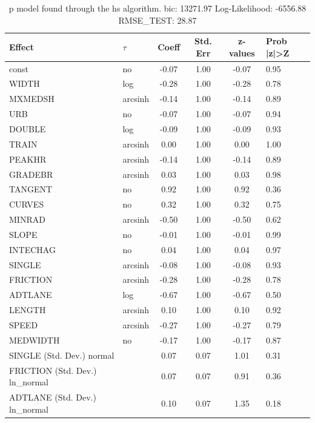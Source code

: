 \begin{table}
	\caption{p model found through the hs algorithm. bic: 13271.97 Log-Likelihood: -6556.88 RMSE_TEST: 28.87}
	\begin{center}
		\begin{tabular}{|l|l|c|c|c|l|}
			\hline
			Effect & $\tau$ & Coeff & Std. Err & z-values & Prob |z|>Z \\
			\hline
			const & no & -0.07 & 1.00 & -0.07 & 0.95 \\
			\hline
			WIDTH & log & -0.28 & 1.00 & -0.28 & 0.78 \\
			\hline
			MXMEDSH & arcsinh & -0.14 & 1.00 & -0.14 & 0.89 \\
			\hline
			URB & no & -0.07 & 1.00 & -0.07 & 0.94 \\
			\hline
			DOUBLE & log & -0.09 & 1.00 & -0.09 & 0.93 \\
			\hline
			TRAIN & arcsinh & 0.00 & 1.00 & 0.00 & 1.00 \\
			\hline
			PEAKHR & arcsinh & -0.14 & 1.00 & -0.14 & 0.89 \\
			\hline
			GRADEBR & arcsinh & 0.03 & 1.00 & 0.03 & 0.98 \\
			\hline
			TANGENT & no & 0.92 & 1.00 & 0.92 & 0.36 \\
			\hline
			CURVES & no & 0.32 & 1.00 & 0.32 & 0.75 \\
			\hline
			MINRAD & arcsinh & -0.50 & 1.00 & -0.50 & 0.62 \\
			\hline
			SLOPE & no & -0.01 & 1.00 & -0.01 & 0.99 \\
			\hline
			INTECHAG & no & 0.04 & 1.00 & 0.04 & 0.97 \\
			\hline
			SINGLE & arcsinh & -0.08 & 1.00 & -0.08 & 0.93 \\
			\hline
			FRICTION & arcsinh & -0.28 & 1.00 & -0.28 & 0.78 \\
			\hline
			ADTLANE & log & -0.67 & 1.00 & -0.67 & 0.50 \\
			\hline
			LENGTH & arcsinh & 0.10 & 1.00 & 0.10 & 0.92 \\
			\hline
			SPEED & arcsinh & -0.27 & 1.00 & -0.27 & 0.79 \\
			\hline
			MEDWIDTH & no & -0.17 & 1.00 & -0.17 & 0.87 \\
			\hline
			SINGLE (Std. Dev.) normal &  & 0.07 & 0.07 & 1.01 & 0.31 \\
			\hline
			FRICTION (Std. Dev.) ln_normal &  & 0.07 & 0.07 & 0.91 & 0.36 \\
			\hline
			ADTLANE (Std. Dev.) ln_normal &  & 0.10 & 0.07 & 1.35 & 0.18 \\

\end{tabular}
\end{center}
\end{table}
